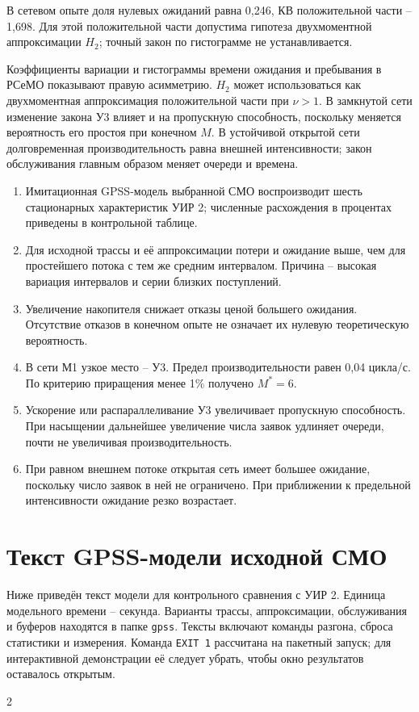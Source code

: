 \documentclass[12pt,a4paper]{article}
\begin{document}
В сетевом опыте доля нулевых ожиданий равна 0,246, КВ положительной части -- 1,698. Для этой положительной части допустима гипотеза двухмоментной аппроксимации \(H_2\); точный закон по гистограмме не устанавливается.

Коэффициенты вариации и гистограммы времени ожидания и пребывания в РСеМО показывают правую асимметрию. \(H_2\) может использоваться как двухмоментная аппроксимация положительной части при \(\nu>1\). В замкнутой сети изменение закона У3 влияет и на пропускную способность, поскольку меняется вероятность его простоя при конечном \(M\). В устойчивой открытой сети долговременная производительность равна внешней интенсивности; закон обслуживания главным образом меняет очереди и времена.

\begin{enumerate}
\item Имитационная GPSS-модель выбранной СМО воспроизводит шесть стационарных характеристик УИР 2; численные расхождения в процентах приведены в контрольной таблице.
\item Для исходной трассы и её аппроксимации потери и ожидание выше, чем для простейшего потока с тем же средним интервалом. Причина -- высокая вариация интервалов и серии близких поступлений.
\item Увеличение накопителя снижает отказы ценой большего ожидания. Отсутствие отказов в конечном опыте не означает их нулевую теоретическую вероятность.
\item В сети М1 узкое место -- У3. Предел производительности равен 0,04 цикла/с. По критерию приращения менее 1\% получено \(M^*=6\).
\item Ускорение или распараллеливание У3 увеличивает пропускную способность. При насыщении дальнейшее увеличение числа заявок удлиняет очереди, почти не увеличивая производительность.
\item При равном внешнем потоке открытая сеть имеет большее ожидание, поскольку число заявок в ней не ограничено. При приближении к предельной интенсивности ожидание резко возрастает.
\end{enumerate}

\newpage\appendix
\section{Текст GPSS-модели исходной СМО}
Ниже приведён текст модели для контрольного сравнения с УИР 2. Единица модельного времени -- секунда. Варианты трассы, аппроксимации, обслуживания и буферов находятся в папке \texttt{gpss}. Тексты включают команды разгона, сброса статистики и измерения. Команда \texttt{EXIT 1} рассчитана на пакетный запуск; для интерактивной демонстрации её следует убрать, чтобы окно результатов оставалось открытым.
\begin{multicols}{2}\end{multicols}
\end{document}
